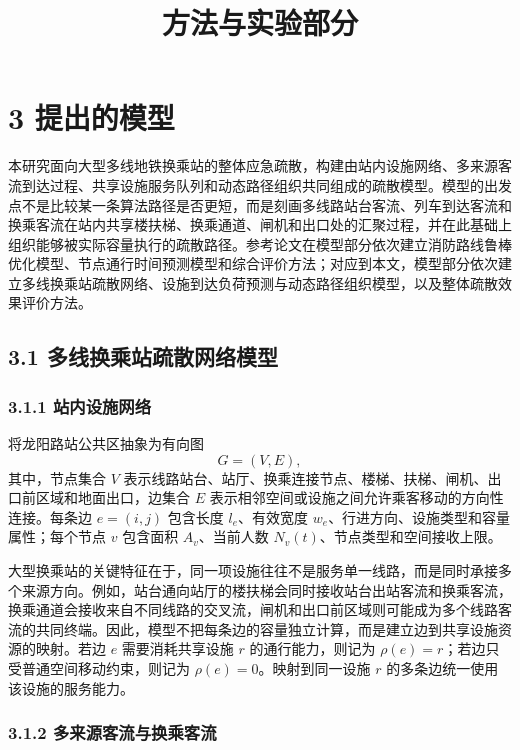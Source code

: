 \documentclass[UTF8,a4paper,12pt]{ctexart}
\title{方法与实验部分}
\author{}
\date{}
\begin{document}
\maketitle

\section{3 提出的模型}

本研究面向大型多线地铁换乘站的整体应急疏散，构建由站内设施网络、多来源客流到达过程、共享设施服务队列和动态路径组织共同组成的疏散模型。模型的出发点不是比较某一条算法路径是否更短，而是刻画多线路站台客流、列车到达客流和换乘客流在站内共享楼扶梯、换乘通道、闸机和出口处的汇聚过程，并在此基础上组织能够被实际容量执行的疏散路径。参考论文在模型部分依次建立消防路线鲁棒优化模型、节点通行时间预测模型和综合评价方法；对应到本文，模型部分依次建立多线换乘站疏散网络、设施到达负荷预测与动态路径组织模型，以及整体疏散效果评价方法。

\subsection{3.1 多线换乘站疏散网络模型}

\subsubsection{3.1.1 站内设施网络}

将龙阳路站公共区抽象为有向图
\[
G=(V,E),
\]
其中，节点集合 \(V\) 表示线路站台、站厅、换乘连接节点、楼梯、扶梯、闸机、出口前区域和地面出口，边集合 \(E\) 表示相邻空间或设施之间允许乘客移动的方向性连接。每条边 \(e=(i,j)\) 包含长度 \(l_e\)、有效宽度 \(w_e\)、行进方向、设施类型和容量属性；每个节点 \(v\) 包含面积 \(A_v\)、当前人数 \(N_v(t)\)、节点类型和空间接收上限。

大型换乘站的关键特征在于，同一项设施往往不是服务单一线路，而是同时承接多个来源方向。例如，站台通向站厅的楼扶梯会同时接收站台出站客流和换乘客流，换乘通道会接收来自不同线路的交叉流，闸机和出口前区域则可能成为多个线路客流的共同终端。因此，模型不把每条边的容量独立计算，而是建立边到共享设施资源的映射。若边 \(e\) 需要消耗共享设施 \(r\) 的通行能力，则记为 \(\rho(e)=r\)；若边只受普通空间移动约束，则记为 \(\rho(e)=0\)。映射到同一设施 \(r\) 的多条边统一使用该设施的服务能力。

\subsubsection{3.1.2 多来源客流与换乘客流}
\end{document}

